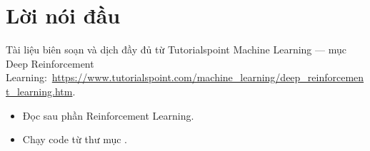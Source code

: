 \documentclass[12pt,a4paper]{article}
\newcommand{\tsurl}[1]{\url{#1}}
\begin{document}

\newpage
\tableofcontents
\newpage

\section*{Lời nói đầu}

\begin{ynghia}[title={Nguồn}]
Tài liệu biên soạn và dịch đầy đủ từ Tutorialspoint Machine Learning --- mục Deep Reinforcement Learning:\ \tsurl{https://www.tutorialspoint.com/machine_learning/deep_reinforcement_learning.htm}.
\end{ynghia}

\begin{phuongphap}[title={Cách dùng}]
\begin{itemize}
  \item Đọc sau phần Reinforcement Learning.
  \item Chạy code từ thư mục .
\end{itemize}
\end{phuongphap}

\newpage






\end{document}
